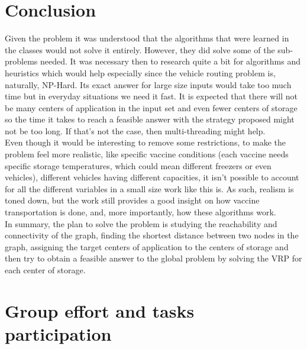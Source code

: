 \documentclass{article}
\begin{document}
\section{Conclusion}
Given the problem it was understood that the algorithms that were learned in the classes would not solve it entirely. However, they did solve some of the sub-problems needed. It was necessary then to research quite a bit for algorithms and heuristics which would help especially since the vehicle routing problem is, naturally, NP-Hard. Its exact answer for large size inputs would take too much time but in everyday situations we need it fast. It is expected that there will not be many centers of application in the input set and even fewer centers of storage so the time it takes to reach a feasible answer with the strategy proposed might not be too long. If that's not the case, then multi-threading might help.\\
Even though it would be interesting to remove some restrictions, to make the problem feel more realistic, like specific vaccine conditions (each vaccine needs specific storage temperatures, which could mean different freezers or even vehicles), different vehicles having different capacities, it isn't possible to account for all the different variables in a small size work like this is. As such, realism is toned down, but the work still provides a good insight on how vaccine transportation is done, and, more importantly, how these algorithms work.\\
In summary, the plan to solve the problem is studying the reachability and connectivity of the graph, finding the shortest distance between two nodes in the graph, assigning the target centers of application to the centers of storage and then try to obtain a feasible answer to the global problem by solving the VRP for each center of storage.\\
\section{Group effort and tasks participation}
\end{document}
